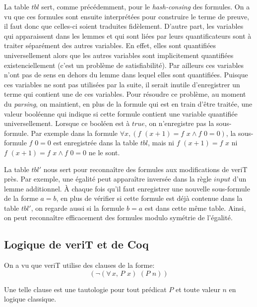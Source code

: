 \documentclass[11pt]{article}
\begin{document}
La table $tbl$ sert, comme précédemment, pour le \textit{hash-consing} des formules. On a vu que ces formules sont ensuite interprétées pour construire le terme de preuve, il faut donc que celles-ci soient traduites fidèlement. D'autre part, les variables qui apparaissent dans les lemmes et qui sont liées par leurs quantificateurs sont à traiter séparément des autres variables. En effet, elles sont quantifiées universellement alors que les autres variables sont implicitement quantifiées existenciellement (c'est un problème de satisfiabilité). Par ailleurs ces variables n'ont pas de sens en dehors du lemme dans lequel elles sont quantifiées. Puisque ces variables ne sont pas utilisées par la suite, il serait inutile d'enregistrer un terme qui contient une de ces variables.
Pour résoudre ce problème, au moment du \textit{parsing}, on maintient, en plus de la formule qui est en train d'être traitée, une valeur booléenne qui indique si cette formule contient une variable quantifiée universellement. Lorsque ce booléen est à $true$, on n'enregistre pas la sous-formule. Par exemple dans la formule $\forall x, (f \,\, (x+1) = f \,\, x \wedge f\,\,0 = 0)$, la sous-formule $f \,\, 0 = 0$ est enregistrée dans la table $tbl$, mais ni $f\,\,(x+1) = f\,\,x$ ni $f \,\, (x+1) = f \,\, x \wedge f\,\,0 = 0$ ne le sont.\medbreak

La table $tbl'$ nous sert pour reconnaître des formules aux modifications de veriT près. Par exemple, une égalité  peut apparaître inversée  dans la règle $input$ d'un lemme additionnel. À chaque fois qu'il faut enregistrer une nouvelle sous-formule de la forme $a = b$, en plus de vérifier si cette formule est déjà contenue dans la table $tbl'$, on regarde aussi si la formule $b = a$ est dans cette même table. Ainsi, on peut reconnaître efficacement des formules modulo symétrie de l'égalité.

\subsection{Logique de veriT et de Coq}
On a vu que veriT utilise des clauses de la forme: 
\[  (\neg (\forall \, x, \, P \,\, x) \,\, (P \,\, n)) \]

Une telle clause est une tautologie pour tout prédicat $P$ et toute valeur $n$ en logique classique. \medbreak 
\end{document}
